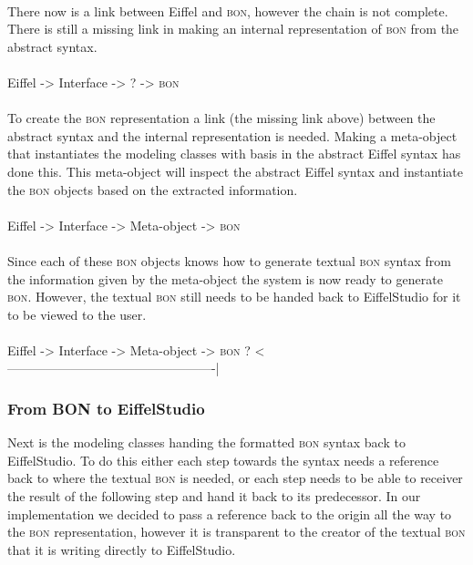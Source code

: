 \paragraph{}
There now is a link between Eiffel and \textsc{bon}, however the chain is not complete. There is still a missing link in making an internal representation of \textsc{bon} from the abstract syntax.

\paragraph{}
Eiffel -> Interface -> ? -> \textsc{bon}

\paragraph{}
To create the \textsc{bon} representation a link (the missing link above) between the abstract syntax and the internal representation is needed. Making a meta-object that instantiates the modeling classes with basis in the abstract Eiffel syntax has done this. This meta-object will inspect the abstract Eiffel syntax and instantiate the \textsc{bon} objects based on the extracted information.

\paragraph{}
Eiffel -> Interface -> Meta-object -> \textsc{bon}

\paragraph{}
Since each of these \textsc{bon} objects knows how to generate textual \textsc{bon} syntax from the information given by the meta-object the system is now ready to generate \textsc{bon}. However, the textual \textsc{bon} still needs to be handed back to EiffelStudio for it to be viewed to the user.

\paragraph{}
Eiffel -> Interface -> Meta-object -> \textsc{bon} \newline
    ? <-------------------------------------------------|

\subsubsection{From BON to EiffelStudio}
Next is the modeling classes handing the formatted \textsc{bon} syntax back to EiffelStudio. To do this either each step towards the syntax needs a reference back to where the textual \textsc{bon} is needed, or each step needs to be able to receiver the result of the following step and hand it back to its predecessor. In our implementation we decided to pass a reference back to the origin all the way to the \textsc{bon} representation, however it is transparent to the creator of the textual \textsc{bon} that it is writing directly to EiffelStudio.

